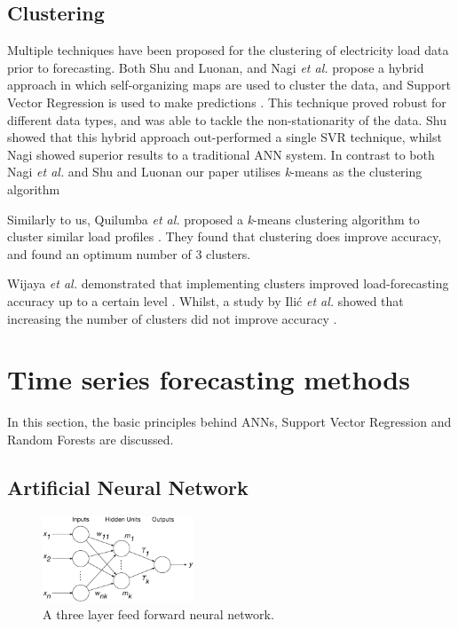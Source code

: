 \subsection{Clustering}

Multiple techniques have been proposed for the clustering of electricity load data prior to forecasting. Both Shu and Luonan, and Nagi \textit{et al.} propose a hybrid approach in which self-organizing maps are used to cluster the data, and Support Vector Regression is used to make predictions \cite{Shu2006,Tiong2008}. This technique proved robust for different data types, and was able to tackle the non-stationarity of the data. Shu showed that this hybrid approach out-performed a single SVR technique, whilst Nagi showed superior results to a traditional ANN system. In contrast to both Nagi \textit{et al.} and Shu and Luonan our paper utilises \textit{k}-means as the clustering algorithm 

Similarly to us, Quilumba \textit{et al.} proposed a \textit{k}-means clustering algorithm to cluster similar load profiles \cite{Quilumba2014}. They found that clustering does improve accuracy, and found an optimum number of 3 clusters.

Wijaya \textit{et al.} demonstrated that implementing clusters improved load-forecasting accuracy up to a certain level \cite{Wijaya2010}. Whilst, a study by Ili\'c \textit{et al.} showed that increasing the number of clusters did not improve accuracy \cite{Ilic2013}.


\section{Time series forecasting methods}

In this section, the basic principles behind ANNs, Support Vector Regression and Random Forests are discussed.

\subsection{Artificial Neural Network}


\begin{figure}
	\includegraphics[width=0.4\textwidth]{figures/Kell_eEnergy_Fig1.eps}
	\caption{A three layer feed forward neural network.}
	\label{fig:mlp}
\end{figure}


